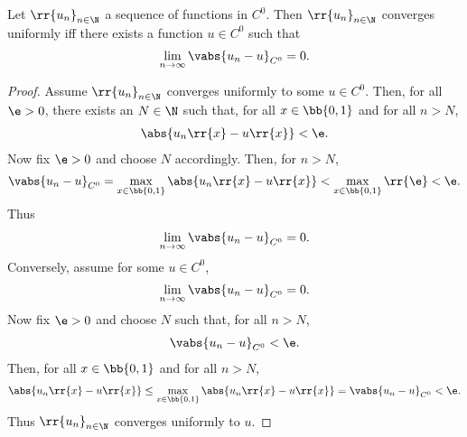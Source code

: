\documentclass{article}
\begin{document}
\begin{lemma} \label{uniform-iff-pointwise}
  Let $ \rr{u_n}_{n\in\N}$ a sequence of functions in $C^0$. Then $ \rr{u_n}_{n\in\N}$ converges
  uniformly iff there exists a function $u\in C^0$ such that
  \begin{align*}
    \lim_{n\to\infty} \vabs{u_n-u}_{C^0}=0.
  \end{align*}
  \begin{proof}
    Assume $ \rr{u_n}_{n\in\N}$ converges uniformly to some $u\in C^0$. Then, for all $\e > 0$,
    there exists an $N\in\N$ such that, for all $x\in \bb{ 0,1 }$ and for all $n>N$,
    \begin{align*}
      \abs{u_n \rr{ x } - u \rr{ x }} < \e.
    \end{align*}
    Now fix $\e>0$ and choose $N$ accordingly. Then, for $n>N$,
    \begin{align*}
      \vabs{u_n-u}_{C^0} = \max_{x\in \bb{ 0,1 }} \abs{u_n \rr{ x } - u \rr{ x } } < \max_{x\in \bb{0,1}} \rr{\e} < \e.
    \end{align*}
    Thus \begin{align*}
      \lim_{n\to\infty} \vabs{u_n-u}_{C^0} = 0.
    \end{align*}
    Conversely, assume for some $u\in C^0$,
    \begin{align*}
      \lim_{n\to\infty} \vabs{u_n-u}_{C^0} = 0.
    \end{align*}
    Now fix $\e>0$ and choose $N$ such that, for all $n>N$,
    \begin{align*}
      \vabs{u_n-u}_{C^0}<\e.
    \end{align*}
    Then, for all $x\in \bb{ 0,1 }$ and for all $n>N$,
    \begin{align*}
      \abs{u_n \rr{ x } - u \rr{ x }} \leq \max_{x\in \bb{ 0,1 }} \abs{u_n \rr{ x } - u \rr{ x }} = \vabs{u_n-u}_{C^0} < \e.
    \end{align*}
    Thus $ \rr{u_n}_{n\in\N}$ converges uniformly to $u$.
  \end{proof}
\end{lemma}
\end{document}
